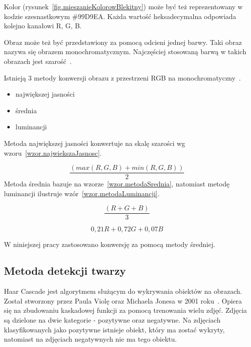 \documentclass[a4paper,twoside,12pt]{book}
\begin{document}
    Kolor (rysunek~\ref{fig.mieszanieKolorowBlekitny}) może być też reprezentowany w kodzie szesnastkowym \#99D9EA.
    Każda
    wartość heksadecymalna odpowiada kolejno kanałowi R, G, B.

    Obraz może też być przedstawiony za pomocą odcieni jednej barwy.
    Taki obraz nazywa się obrazem monochromatycznym.
    Najczęściej stosowaną barwą w takich obrazach jest szarość~\cite{przestrzenieKolorow}.

    Istnieją 3 metody konwersji obrazu z przestrzeni RGB na monochromatyczny~\cite{colorMixing}.
    \begin{itemize}
        \item największej jasności
        \item średnia
        \item luminancji
    \end{itemize}
    Metoda największej jasności konwertuje na skalę szarości wg wzoru~\ref{wzor.najwiekszaJasnosc}.

    \large
    \begin{equation}
        \frac{(max(R, G, B) + min(R, G, B))}{2}
        \label{wzor.najwiekszaJasnosc}
    \end{equation}
    \normalsize
    Metoda średnia bazuje na wzorze~\ref{wzor.metodaSrednia}, natomiast metodę luminancji ilustruje wzór~\ref{wzor.metodaLuminancji}.

    \large
    \begin{equation}
        \frac{(R + G + B)}{3}
        \label{wzor.metodaSrednia}
    \end{equation}
    \normalsize

    \large
    \begin{equation}
        0,21 R + 0,72 G + 0,07 B
        \label{wzor.metodaLuminancji}
    \end{equation}
    \normalsize

    W niniejszej pracy zastosowano konwersję za pomocą metody średniej.
    \subsection{Metoda detekcji twarzy}\label{subsec:algorytm-haar-cascade}

    Haar Cascade jest algorytmem służącym do wykrywania obiektów na obrazach.
    Został stworzony przez Paula Violę oraz Michaela Jonesa w 2001 roku~\cite{violaJones}.
    Opiera się na zbudowaniu kaskadowej funkcji za pomocą trenowania wielu zdjęć.
    Zdjęcia są dzielone na
    dwie kategorie - pozytywne oraz negatywne.
    Na zdjęciach klasyfikowanych jako pozytywne istnieje obiekt, który ma zostać wykryty, natomiast
    na zdjęciach negatywnych nie ma tego obiektu.
\end{document}
